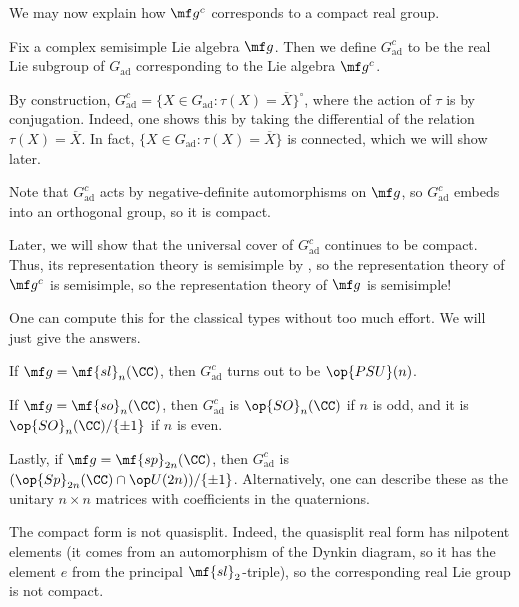 \documentclass[../notes.tex]{subfiles}
\begin{document}
We may now explain how $\mf g^c$ corresponds to a compact real group.
\begin{definition}
	Fix a complex semisimple Lie algebra $\mf g$. Then we define $G_{\mathrm{ad}}^c$ to be the real Lie subgroup of $G_{\mathrm{ad}}$ corresponding to the Lie algebra $\mf g^c$.
\end{definition}
\begin{remark}
	By construction, $G_{\mathrm{ad}}^c=\{X\in G_{\mathrm{ad}}:\tau(X)=\overline X\}^\circ$, where the action of $\tau$ is by conjugation. Indeed, one shows this by taking the differential of the relation $\tau(X)=\overline X$. In fact, $\{X\in G_{\mathrm{ad}}:\tau(X)=\overline X\}$ is connected, which we will show later.
\end{remark}
\begin{remark}
	Note that $G_{\mathrm{ad}}^c$ acts by negative-definite automorphisms on $\mf g$, so $G_{\mathrm{ad}}^c$ embeds into an orthogonal group, so it is compact.
\end{remark}
\begin{remark}
	Later, we will show that the universal cover of $G_{\mathrm{ad}}^c$ continues to be compact. Thus, its representation theory is semisimple by , so the representation theory of $\mf g^c$ is semisimple, so the representation theory of $\mf g$ is semisimple!
\end{remark}
One can compute this for the classical types without too much effort. We will just give the answers.
\begin{example}
	If $\mf g=\mf{sl}_n(\CC)$, then $G_{\mathrm{ad}}^c$ turns out to be $\op{PSU}(n)$.
\end{example}
\begin{example}
	If $\mf g=\mf{so}_n(\CC)$, then $G_{\mathrm{ad}}^c$ is $\op{SO}_n(\CC)$ if $n$ is odd, and it is $\op{SO}_n(\CC)/\{\pm1\}$ if $n$ is even.
\end{example}
\begin{example}
	Lastly, if $\mf g=\mf{sp}_{2n}(\CC)$, then $G_{\mathrm{ad}}^c$ is $(\op{Sp}_{2n}(\CC)\cap\op U(2n))/\{\pm1\}$. Alternatively, one can describe these as the unitary $n\times n$ matrices with coefficients in the quaternions.
\end{example}
\begin{remark}
	The compact form is not quasisplit. Indeed, the quasisplit real form has nilpotent elements (it comes from an automorphism of the Dynkin diagram, so it has the element $e$ from the principal $\mf{sl}_2$-triple), so the corresponding real Lie group is not compact.
\end{remark}
\end{document}

